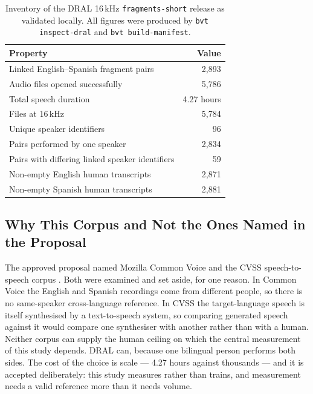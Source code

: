 \begin{table}[htbp]
\caption{Inventory of the DRAL 16\,kHz \texttt{fragments-short} release as validated locally. All
figures were produced by \texttt{bvt inspect-dral} and \texttt{bvt build-manifest}.}
\label{tab:corpus}
\centering
{\singlespacing\small
\begin{tabular}{@{}lr@{}}
\toprule
\textbf{Property} & \textbf{Value} \\
\midrule
Linked English--Spanish fragment pairs & 2{,}893 \\
Audio files opened successfully        & 5{,}786 \\
Total speech duration                  & 4.27 hours \\
Files at 16\,kHz                       & 5{,}784 \\
Unique speaker identifiers             & 96 \\
Pairs performed by one speaker         & 2{,}834 \\
Pairs with differing linked speaker identifiers & 59 \\
Non-empty English human transcripts    & 2{,}871 \\
Non-empty Spanish human transcripts    & 2{,}881 \\
\bottomrule
\end{tabular}\par}
\end{table}

\subsection{Why This Corpus and Not the Ones Named in the Proposal}
\label{sec:corpus_choice}

The approved proposal named Mozilla Common Voice \cite{ardila2020commonvoice} and the CVSS
speech-to-speech corpus \cite{jia2022cvss}. Both were examined and set aside, for one reason. In
Common Voice the English and Spanish recordings come from different people, so there is no
same-speaker cross-language reference. In CVSS the target-language speech is itself synthesised by
a text-to-speech system, so comparing generated speech against it would compare one synthesiser
with another rather than with a human. Neither corpus can supply the human ceiling on which the
central measurement of this study depends. DRAL can, because one bilingual person performs both
sides. The cost of the choice is scale --- 4.27 hours against thousands --- and it is accepted
deliberately: this study measures rather than trains, and measurement needs a valid reference more
than it needs volume.

